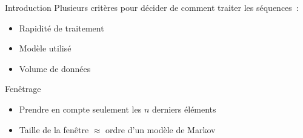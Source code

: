 \begin{frame}{Introduction}
  Plusieurs critères pour décider de comment traiter les séquences~:

  \begin{itemize}[<+->]
    \item Rapidité de traitement
    \item Modèle utilisé
    \item Volume de données
  \end{itemize}
\end{frame}

\begin{frame}{Fenêtrage}
  \begin{itemize}[<+->]
    \item Prendre en compte seulement les $n$ derniers éléments
    \item Taille de la fenêtre $\approx$ ordre d'un modèle de Markov
  \end{itemize}

\end{frame}

